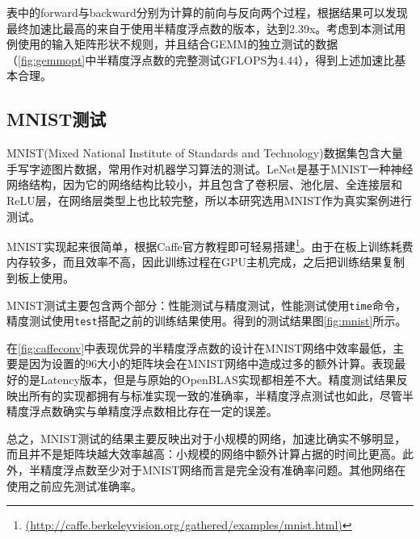 表中的forward与backward分别为计算的前向与反向两个过程，根据结果可以发现最终加速比最高的来自于使用半精度浮点数的版本，达到2.39x。考虑到本测试用例使用的输入矩阵形状不规则，并且结合GEMM的独立测试的数据（\ref{fig:gemmopt}中半精度浮点数的完整测试GFLOPS为4.44），得到上述加速比基本合理。

\subsection{MNIST测试}

MNIST(Mixed National Institute of Standards and Technology)数据集包含大量手写字迹图片数据，常用作对机器学习算法的测试。LeNet\supercite{lecun1998gradient}是基于MNIST一种神经网络结构，因为它的网络结构比较小，并且包含了卷积层、池化层、全连接层和ReLU层，在网络层类型上也比较完整，所以本研究选用MNIST作为真实案例进行测试。

MNIST实现起来很简单，根据Caffe官方教程即可轻易搭建\footnote{\url{(http://caffe.berkeleyvision.org/gathered/examples/mnist.html)}}。由于在板上训练耗费内存较多，而且效率不高，因此训练过程在GPU主机完成，之后把训练结果复制到板上使用。

MNIST测试主要包含两个部分：性能测试与精度测试，性能测试使用\texttt{time}命令，精度测试使用\texttt{test}搭配之前的训练结果使用。得到的测试结果图\ref{fig:mnist}所示。

在\ref{fig:caffeconv}中表现优异的半精度浮点数的设计在MNIST网络中效率最低，主要是因为设置的96大小的矩阵块会在MNIST网络中造成过多的额外计算。表现最好的是Latency版本，但是与原始的OpenBLAS实现都相差不大。精度测试结果反映出所有的实现都拥有与标准实现一致的准确率，半精度浮点测试也如此，尽管半精度浮点数确实与单精度浮点数相比存在一定的误差。

总之，MNIST测试的结果主要反映出对于小规模的网络，加速比确实不够明显，而且并不是矩阵块越大效率越高：小规模的网络中额外计算占据的时间比更高。此外，半精度浮点数至少对于MNIST网络而言是完全没有准确率问题。其他网络在使用之前应先测试准确率。